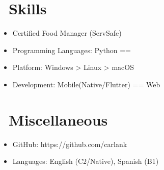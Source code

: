 \documentclass{resume}
\begin{document}

\section{\faCogs\ Skills}
\begin{itemize}[parsep=0.5ex]
  \item Certified Food Manager (ServSafe)
  \item Programming Languages: Python == 
  \item Platform: Windows > Linux > macOS
  \item Development: Mobile(Native/Flutter) == Web
\end{itemize}

\section{\faInfo\ Miscellaneous}
\begin{itemize}[parsep=0.5ex]
  \item GitHub: https://github.com/carlank
  \item Languages: English (C2/Native), Spanish (B1)
\end{itemize}

%
%
\end{document}
